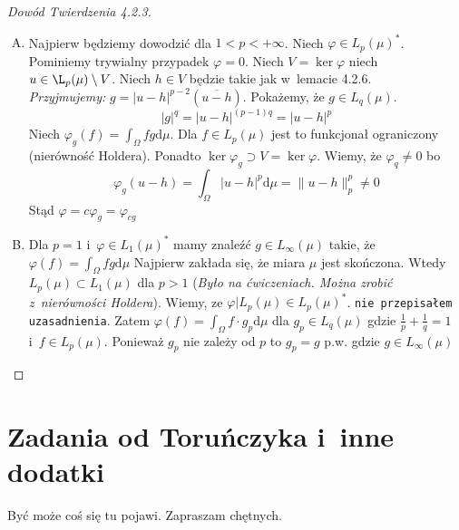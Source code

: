 \documentclass[11pt]{mwrep}
\renewcommand{\[}{\begin{equation}}
\renewcommand{\]}{\end{equation}}
\newcommand{\dd}{\mathrm{d}}
\newcounter{numer}
\begin{document}
\begin{proof}[Dowód Twierdzenia 4.2.3]\mbox{}
	\begin{enumerate}[(A)]
		\item Najpierw będziemy dowodzić dla $1 < p <+\infty$. Niech $\varphi \in L_p(\mu)^*$. Pominiemy trywialny przypadek $\varphi =0$.
			Niech $V = \ker \varphi$ niech $u \in \L_p(\mu) \setminus V$. Niech $h \in V$ będzie takie jak w~lemacie 4.2.6. \\
			\emph{Przyjmujemy:} $g= |u-h|^{p-2}(\overline{u - h})$.
			Pokażemy, że $g \in L_q(\mu)$. $$|g|^q = |u-h|^{(p-1)q} = |u-h|^p$$
			Niech $\displaystyle\varphi_g(f) = \int_\Omega fg \dd \mu$. Dla $f \in L_p(\mu)$ jest to funkcjonał ograniczony (nierówność Holdera).
			Ponadto $\ker \varphi_g \supset V = \ker \varphi$.
			Wiemy, że $\varphi_q \not = 0$ bo 
			$$\varphi_g (u-h) = \int_\Omega |u-h|^p \dd \mu  = \|u-h\|_p^p \not =0$$
			Stąd $\varphi = c \varphi_g = \varphi_{cg}$ 
		\item Dla $p=1$ i~$\varphi \in L_1 (\mu)^*$ mamy znaleźć $g \in L_\infty(\mu)$ takie, że $\varphi(f) = \int_\Omega fg\dd\mu$ 
			Najpierw zakłada się, że  miara $\mu$ jest skończona. Wtedy $L_p (\mu) \subset L_1(\mu)$ dla $p>1$ 
			(\emph{Było na ćwiczeniach. Można zrobić z~nierówności Holdera}).
			Wiemy, ze $\varphi|L_p(\mu) \in L_p(\mu)^*$. \texttt{nie przepisałem uzasadnienia}.
			Zatem $\varphi(f)  = \int_\Omega f \cdot g_p \dd \mu$ dla $g_p \in L_q(\mu)$ gdzie $\frac{1}{p}+\frac{1}{q} = 1$ i~$f \in L_p (\mu)$.
			Ponieważ $g_p$ nie zależy od $p$ to $g_p = g$ p.w. gdzie $g \in L_\infty(\mu)$ 

	\end{enumerate}
\end{proof}


\chapter{Zadania od Toruńczyka i~inne dodatki}
Być może coś się tu pojawi. Zapraszam chętnych. \\
\setlength{\unitlength}{4cm}

\newpage
\end{document}
